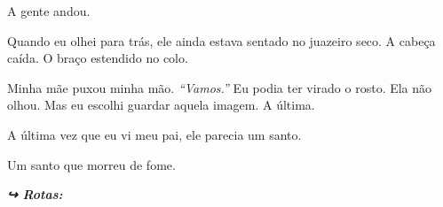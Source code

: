 \noindent A gente andou.

\noindent Quando eu olhei para trás, ele ainda estava sentado no juazeiro seco. A cabeça caída. O braço estendido no colo.

\noindent Minha mãe puxou minha mão. \textit{\textquotedblleft{}Vamos.\textquotedblright{}} Eu podia ter virado o rosto. Ela não olhou. Mas eu escolhi guardar aquela imagem. A última.

\noindent A última vez que eu vi meu pai, ele parecia um santo.

\noindent Um santo que morreu de fome.

\vspace{0.5em}
\noindent\textit{\textbf{↪ Rotas:}  \rotasep {} \rotasep {}}